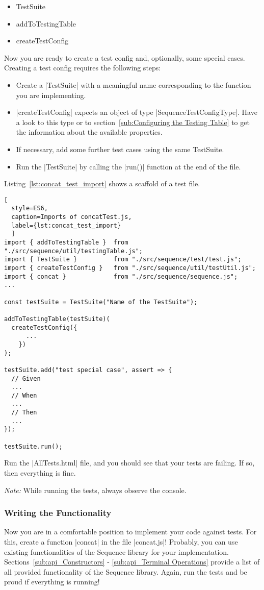 \begin{itemize}
  \item{TestSuite}
  \item{addToTestingTable}
  \item{createTestConfig}
\end{itemize}
Now you are ready to create a test config and, optionally, some special cases.
Creating a test config requires the following steps:

\begin{itemize}
  \item{Create a |TestSuite| with a meaningful name corresponding to the function you are implementing.}
  \item{|createTestConfig| expects an object of type |SequenceTestConfigType|. Have a look
    to this type or to section~\ref{sub:Configuring the Testing Table} to get the information about the available properties. }
      \item{If necessary, add some further test cases using the same TestSuite.}
  \item{Run the |TestSuite| by calling the |run()| function at the end of the file. }
\end{itemize}

Listing~\ref{lst:concat_test_import} shows a scaffold of a test file. 

\begin{lstlisting}[
  style=ES6, 
  caption=Imports of concatTest.js,
  label={lst:concat_test_import}
  ]
import { addToTestingTable }  from "./src/sequence/util/testingTable.js";
import { TestSuite }          from "./src/sequence/test/test.js";
import { createTestConfig }   from "./src/sequence/util/testUtil.js";
import { concat }             from "./src/sequence/sequence.js";
...

const testSuite = TestSuite("Name of the TestSuite");

addToTestingTable(testSuite)(
  createTestConfig({
      ...
    })
);

testSuite.add("test special case", assert => {
  // Given
  ...
  // When
  ...
  // Then
  ...
});

testSuite.run();
\end{lstlisting}

Run the |AllTests.html| file, and you should see that your tests are failing.
If so, then everything is fine.

\textit{Note:} While running the tests, always observe the console.

\subsubsection{Writing the Functionality}
\label{subsub:Write the Functionality}
Now you are in a comfortable position to implement your code against tests.
For this, create a function |concat| in the file |concat.js|!
Probably, you can use existing functionalities of the Sequence library for your
implementation. Sections~\ref{sub:api_Constructors} - \ref{sub:api_Terminal
Operations} provide a list of all provided functionality of the Sequence
library.
\newline
Again, run the tests and be proud if everything is running!
